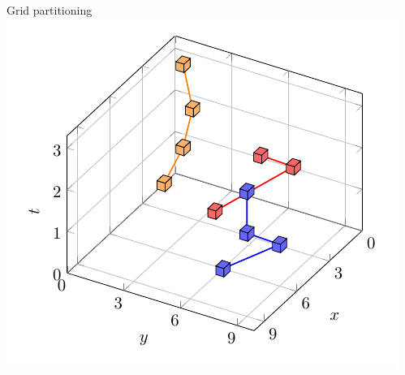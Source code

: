 \documentclass{beamer}
\theoremstyle{definition}
\begin{document}
\begin{frame}{Grid partitioning}
    \centering
    \includegraphics[width=0.9\textheight]{cube}
\end{frame}
\end{document}
